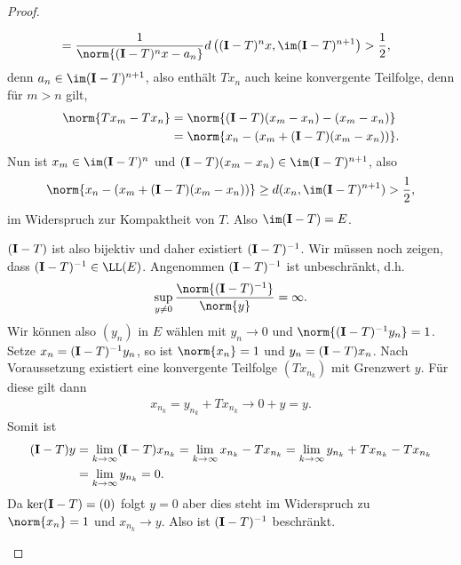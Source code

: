 \begin{proof}
\begin{proofenum}
\begin{proofenuma}
\begin{align*}
&=
\frac{1}{\norm{(\Id-T)^nx-a_n}}d
\left((\Id-T)^nx,\im (\Id-T)^{n+1}\right) > \frac{1}{2},
\end{align*}
denn $a_n\in \im (\Id-T)^{n+1}$, also enthält $Tx_n$ auch keine konvergente
Teilfolge, denn für $m>n$ gilt,
\begin{align*}
\norm{Tx_m-Tx_n} &= \norm{(\Id-T)(x_m-x_n)-(x_m-x_n)}
\\ &= \norm{x_n - \left(x_m + (\Id-T)(x_m-x_n) \right)}.
\end{align*}
Nun ist $x_m\in \im (\Id-T)^{n}$ und $(\Id-T)(x_m-x_n)\in \im(\Id-T)^{n+1}$,
also
\begin{align*}
\norm{x_n - \left(x_m + (\Id-T)(x_m-x_n) \right)}
\ge d(x_n, \im (\Id-T)^{n+1}) > \frac{1}{2},
\end{align*}
im Widerspruch zur Kompaktheit von $T$. Also $\im(\Id-T)=E$. 
\item
$(\mathbf{I}-T)$ ist also bijektiv und daher existiert $(\mathbf{I}-T)^{-1}$. Wir müssen noch
zeigen, dass $(\Id-T)^{-1}\in\LL(E)$. Angenommen $(\mathbf{I}-T)^{-1}$ ist
unbeschränkt, d.h.
\begin{align*}
\sup\limits_{y\neq 0} \frac{\norm{(\Id-T)^{-1}}}{\norm{y}} = \infty.
\end{align*}
Wir können also $(y_n)$ in $E$ wählen mit $y_n\to 0$ und
$\norm{(\Id-T)^{-1}y_n}=1$. Setze $x_n=(\mathbf{I}-T)^{-1}y_n$, so ist $\norm{x_n}=1$
und $y_n=(\mathbf{I}-T)x_n$. Nach Voraussetzung existiert eine konvergente Teilfolge $(Tx_{n_k})$ mit Grenzwert
$y$. Für diese gilt dann
\begin{align*}
x_{n_k} = y_{n_k}+Tx_{n_k} \to 0 + y = y.
\end{align*}
Somit ist
\begin{align*}
(\mathbf{I}-T)y &= \lim\limits_{k\to\infty} (\mathbf{I}-T)x_{n_k}
= \lim\limits_{k\to\infty} x_{n_k}-Tx_{n_k} = 
\lim\limits_{k\to\infty} y_{n_k}+Tx_{n_k}-Tx_{n_k} \\ &= 
\lim\limits_{k\to\infty} y_{n_k} = 0.
\end{align*}
Da $\ker (\mathbf{I}-T)=(0)$ folgt $y=0$ aber dies steht im Widerspruch zu
$\norm{x_n}=1$ und $x_{n_k}\to y$. Also ist $(\mathbf{I}-T)^{-1}$ beschränkt.\qedhere
\end{proofenuma}
\end{proofenum}
\end{proof}

